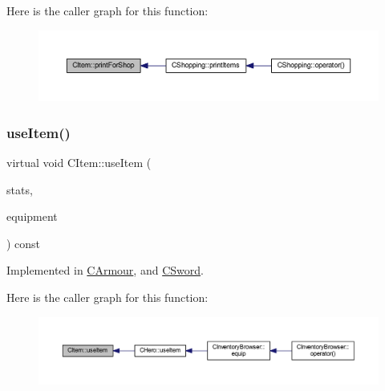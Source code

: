 Here is the caller graph for this function\+:\nopagebreak
\begin{figure}[H]
\begin{center}
\leavevmode
\includegraphics[width=350pt]{class_c_item_af56df4ab4d87984c56401231dd3492cf_icgraph}
\end{center}
\end{figure}
\mbox{\label{class_c_item_a30e8dd9608c78cd43e5c973bfe029baa}} 
\subsubsection{\texorpdfstring{use\+Item()}{useItem()}}
{\footnotesize\ttfamily virtual void C\+Item\+::use\+Item (\begin{DoxyParamCaption}\item[{\mbox{\hyperlink{struct_hero_stats}{Hero\+Stats}} \&}]{stats,  }\item[{\mbox{\hyperlink{class_c_equipment}{C\+Equipment}} \&}]{equipment }\end{DoxyParamCaption}) const\hspace{0.3cm}{\ttfamily [pure virtual]}}



Implemented in \mbox{\hyperlink{class_c_armour_ab1000a6cfe419ca94b1254217fb707cd}{C\+Armour}}, and \mbox{\hyperlink{class_c_sword_a565b01124ed0c92e6873dcc0263d4a79}{C\+Sword}}.

Here is the caller graph for this function\+:\nopagebreak
\begin{figure}[H]
\begin{center}
\leavevmode
\includegraphics[width=350pt]{class_c_item_a30e8dd9608c78cd43e5c973bfe029baa_icgraph}
\end{center}
\end{figure}


